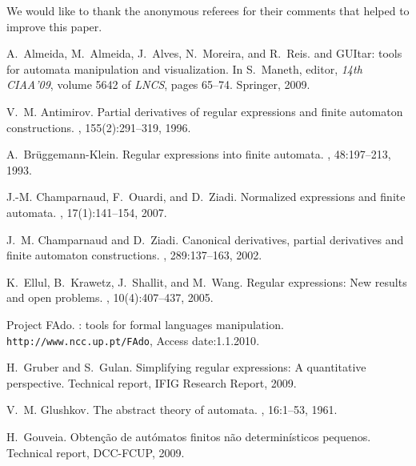 \documentclass{llncs}
\begin{document}
We would like to thank the anonymous referees for their
comments that helped to improve this paper.  

\newcommand{\etalchar}[1]{}
\begin{thebibliography}{EKSW05}

\bibitem[AAA{\etalchar{+}}09]{almeida09:_fado_guitar_c}
A.~Almeida, M.~Almeida, J.~Alves, N.~Moreira, and R.~Reis.
 and {GUItar}: tools for automata manipulation and
  visualization.
\newblock In S.~Maneth, editor, {\em 14th CIAA'09}, volume 5642 of {\em LNCS},
  pages 65--74. Springer, 2009.

V.~M. Antimirov.
\newblock Partial derivatives of regular expressions and finite automaton
  constructions.
, 155(2):291--319, 1996.

A.~Br\"{u}ggemann-Klein.
\newblock Regular expressions into finite automata.
, 48:197--213, 1993.

J.-M. Champarnaud, F.~Ouardi, and D.~Ziadi.
\newblock Normalized expressions and finite automata.
, 17(1):141--154, 2007.

J.~M. Champarnaud and D.~Ziadi.
\newblock Canonical derivatives, partial derivatives and finite automaton
  constructions.
, 289:137--163, 2002.

K.~Ellul, B.~Krawetz, J.~Shallit, and M.~Wang.
\newblock Regular expressions: New results and open problems.
, 10(4):407--437, 2005.

Project FAdo.
: tools for formal languages manipulation.
\newblock \texttt{http://www.ncc.up.pt/FAdo}, {Access date:1.1.2010}.

H.~Gruber and S.~Gulan.
\newblock Simplifying regular expressions: A quantitative perspective.
\newblock Technical report, IFIG Research Report, 2009.

V.~M. Glushkov.
\newblock The abstract theory of automata.
, 16:1--53, 1961.

H.~Gouveia.
\newblock Obtenção de autómatos finitos não determinísticos pequenos.
\newblock Technical report, DCC-FCUP, 2009.


\end{thebibliography}
\end{document}
